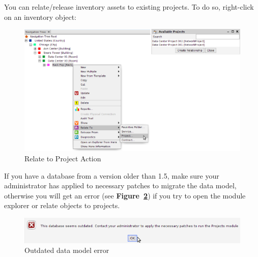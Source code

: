 \documentclass[a4paper]{article}
\begin{document}
		    You can relate/release inventory assets to existing projects. To do so, right-click on an inventory object:
		    		    		    
		    \begin{figure}[h!]
		    	\centering
		    	\includegraphics[width=0.9\linewidth]{img/projects_relate_to.png}
		    	\caption{Relate to Project Action}
		    	\label{fig:projects_relate_to}
		    \end{figure}
		    
		    If you have a database from a version older than 1.5, make sure your administrator has applied to necessary patches to migrate the data model, otherwise you will get an error (see \textbf{Figure~\ref{fig:projects_db_outdated}}) if you try to open the module explorer or relate objects to projects.		    
		    \newpage 
		    \begin{figure}[h!]
		    	\centering
		    	\includegraphics[width=0.9\linewidth]{img/projects_db_outdated.png}
		    	\caption{Outdated data model error}
		    	\label{fig:projects_db_outdated}
		    \end{figure}
		    
\end{document}
